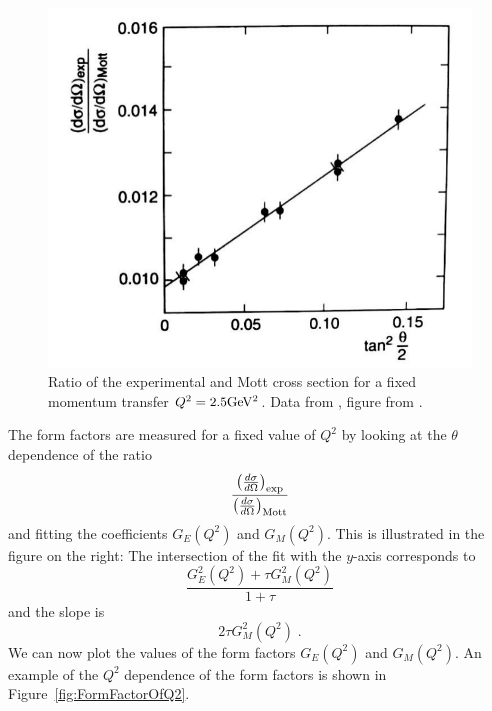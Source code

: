 \documentclass[12pt]{article}
\begin{document}
\begin{figure}
\begin{center}
\includegraphics[scale=0.35,trim=1cm 0.5cm 0.5cm 0.7cm,clip=true]{images/FormFactorOfTan.png}
\end{center}
\caption{Ratio of the experimental and Mott cross section for a fixed momentum transfer $Q^2=2.5 {\rm GeV^2}$. Data from \cite{Taylor}, figure from \cite{povh}. }\label{fig:mottfixedQ}
\end{figure}
The form factors are measured for a fixed value of $Q^2$ by looking at the $\theta$ dependence of the ratio
\[\frac{
\left(\frac{d\sigma}{d\Omega}\right)_{\rm exp}
}{
\left(\frac{d\sigma}{d\Omega}\right)_{\rm  Mott}
}
\]
and fitting the coefficients $G_E(Q^2)$ and $G_M(Q^2)$. This is illustrated in the figure on the right: The intersection of the fit with the $y$-axis corresponds to 
\[\frac{G^2_E(Q^2)+\tau G^2_M(Q^2)}{1+\tau}\]
and the slope is 
\[2\tau G^2_M(Q^2)\;.\]
We can now plot the values of the form factors $G_E(Q^2)$ and $G_M(Q^2)$. An example of the $Q^2$ dependence of the form factors is shown in Figure~\ref{fig:FormFactorOfQ2}. 
\end{document}
